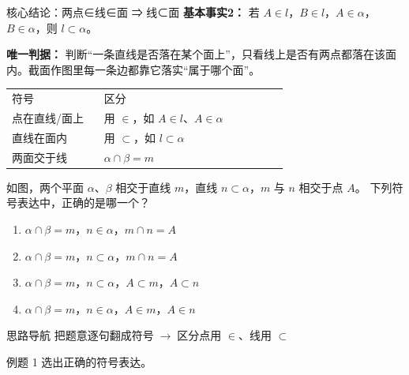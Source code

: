 \documentclass{exam-zh}
\begin{document}
\begin{eduSolutionBox}{核心结论：两点∈线∈面 ⇒ 线⊂面}
  \begingroup
  \setlength{\parskip}{2.5mm}
\textbf{基本事实2：} 若 $A\in l$，$B\in l$，$A\in\alpha$，$B\in\alpha$，则 $l\subset\alpha$。\par
\textbf{唯一判据：} 判断“一条直线是否落在某个面上”，只看线上是否有两点都落在该面内。截面作图里每一条边都靠它落实“属于哪个面”。\par
\begin{tabular}{p{0.30\linewidth}p{0.60\linewidth}}
符号 & 区分\\
点在直线/面上 & 用 $\in$，如 $A\in l$、$A\in\alpha$\\
直线在面内 & 用 $\subset$，如 $l\subset\alpha$\\
两面交于线 & $\alpha\cap\beta=m$\\
\end{tabular}
\par
  \endgroup
\end{eduSolutionBox}




\begin{eduProblemBlock}[例题 1]
如图，两个平面 $\alpha$、$\beta$ 相交于直线 $m$，直线 $n\subset\alpha$，$m$ 与 $n$ 相交于点 $A$。
下列符号表达中，正确的是哪一个？
\begin{enumerate}[label=(\Alph*)]
  \item $\alpha\cap\beta=m$，$n\in\alpha$，$m\cap n=A$
  \item $\alpha\cap\beta=m$，$n\subset\alpha$，$m\cap n=A$
  \item $\alpha\cap\beta=m$，$n\subset\alpha$，$A\subset m$，$A\subset n$
  \item $\alpha\cap\beta=m$，$n\in\alpha$，$A\in m$，$A\in n$
\end{enumerate}

\end{eduProblemBlock}





\begin{eduAuxItem}{思路导航}
把题意逐句翻成符号$\;\to\;$区分点用 $\in$、线用 $\subset$\end{eduAuxItem}




\begin{eduSubQuestionItem}{例题 1}
选出正确的符号表达。\end{eduSubQuestionItem}
\end{document}
